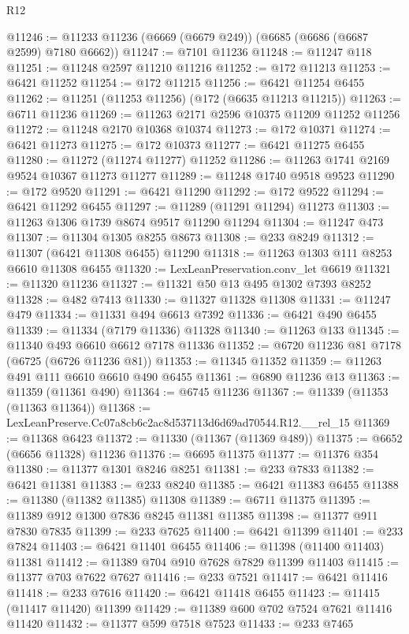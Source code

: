\begin{lexlean}{R12}
\begin{coremodule}
@11246 := @11233 @11236 (@6669 (@6679 @249)) (@6685 (@6686 (@6687 @2599) @7180 @6662))
@11247 := @7101 @11236
@11248 := @11247 @118
@11251 := @11248 @2597 @11210 @11216
@11252 := @172 @11213
@11253 := @6421 @11252
@11254 := @172 @11215
@11256 := @6421 @11254 @6455
@11262 := @11251 (@11253 @11256) (@172 (@6635 @11213 @11215))
@11263 := @6711 @11236
@11269 := @11263 @2171 @2596 @10375 @11209 @11252 @11256
@11272 := @11248 @2170 @10368 @10374
@11273 := @172 @10371
@11274 := @6421 @11273
@11275 := @172 @10373
@11277 := @6421 @11275 @6455
@11280 := @11272 (@11274 @11277) @11252
@11286 := @11263 @1741 @2169 @9524 @10367 @11273 @11277
@11289 := @11248 @1740 @9518 @9523
@11290 := @172 @9520
@11291 := @6421 @11290
@11292 := @172 @9522
@11294 := @6421 @11292 @6455
@11297 := @11289 (@11291 @11294) @11273
@11303 := @11263 @1306 @1739 @8674 @9517 @11290 @11294
@11304 := @11247 @473
@11307 := @11304 @1305 @8255 @8673
@11308 := @233 @8249
@11312 := @11307 (@6421 @11308 @6455) @11290
@11318 := @11263 @1303 @111 @8253 @6610 @11308 @6455
@11320 := LexLeanPreservation.conv_let @6619
@11321 := @11320 @11236
@11327 := @11321 @50 @13 @495 @1302 @7393 @8252
@11328 := @482 @7413
@11330 := @11327 @11328 @11308
@11331 := @11247 @479
@11334 := @11331 @494 @6613 @7392
@11336 := @6421 @490 @6455
@11339 := @11334 (@7179 @11336) @11328
@11340 := @11263 @133
@11345 := @11340 @493 @6610 @6612 @7178 @11336
@11352 := @6720 @11236 @81 @7178 (@6725 (@6726 @11236 @81))
@11353 := @11345 @11352
@11359 := @11263 @491 @111 @6610 @6610 @490 @6455
@11361 := @6890 @11236 @13
@11363 := @11359 (@11361 @490)
@11364 := @6745 @11236
@11367 := @11339 (@11353 (@11363 @11364))
@11368 := LexLeanPreserve.Cc07a8cb6c2ac8d537113d6d69ad70544.R12.__rel_15
@11369 := @11368 @6423
@11372 := @11330 (@11367 (@11369 @489))
@11375 := @6652 (@6656 @11328) @11236
@11376 := @6695 @11375
@11377 := @11376 @354
@11380 := @11377 @1301 @8246 @8251
@11381 := @233 @7833
@11382 := @6421 @11381
@11383 := @233 @8240
@11385 := @6421 @11383 @6455
@11388 := @11380 (@11382 @11385) @11308
@11389 := @6711 @11375
@11395 := @11389 @912 @1300 @7836 @8245 @11381 @11385
@11398 := @11377 @911 @7830 @7835
@11399 := @233 @7625
@11400 := @6421 @11399
@11401 := @233 @7824
@11403 := @6421 @11401 @6455
@11406 := @11398 (@11400 @11403) @11381
@11412 := @11389 @704 @910 @7628 @7829 @11399 @11403
@11415 := @11377 @703 @7622 @7627
@11416 := @233 @7521
@11417 := @6421 @11416
@11418 := @233 @7616
@11420 := @6421 @11418 @6455
@11423 := @11415 (@11417 @11420) @11399
@11429 := @11389 @600 @702 @7524 @7621 @11416 @11420
@11432 := @11377 @599 @7518 @7523
@11433 := @233 @7465

\end{coremodule}
\end{lexlean}
